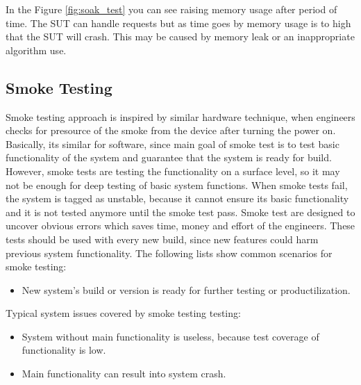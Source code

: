 In the Figure \ref{fig:soak_test} you can see raising memory usage after period of time. The SUT can handle requests but as time goes by memory usage is to high that the SUT will crash. This may be caused by memory leak or an inappropriate algorithm use.

\subsection*{Smoke Testing}
Smoke testing approach is inspired by similar hardware technique, when engineers checks for presource of the smoke from the device after turning the power on. Basically, its similar for software, since main goal of smoke test is to test basic functionality of the system and guarantee that the system is ready for build. However, smoke tests are testing the functionality on a surface level, so it may not be enough for deep testing of basic system functions. When smoke tests fail, the system is tagged as unstable, because it cannot ensure its basic functionality and it is not tested anymore until the smoke test pass. Smoke test are designed to uncover obvious errors which saves time, money and effort of the engineers. These tests should be used with every new build, since new features could harm previous system functionality.
The following lists show common scenarios for smoke testing:
\begin{itemize}
	\setlength\itemsep{0em}
	\item New system's build or version is ready for further testing or productilization.
\end{itemize}
Typical system issues covered by smoke testing testing:
\begin{itemize}
	\setlength\itemsep{0em}
	\item System without main functionality is useless, because test coverage of functionality is low.
	\item Main functionality can result into system crash.
\end{itemize} 


